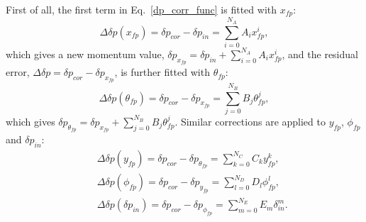  First of all, the first term in Eq.~\eqref{dp_corr_func} is fitted with $x_{fp}$:
\begin{equation}
 \Delta\delta p(x_{fp}) = \delta p_{cor} - \delta p_{in} = \sum_{i=0}^{N_{A}}A_{i}x_{fp}^{i},
 \label{deltap_corr_xfp}
\end{equation}
which gives a new momentum value, $\delta p_{x_{fp}}=\delta p_{in}+\sum_{i=0}^{N_{A}}A_{i}x_{fp}^{i}$, and the residual error, $\Delta\delta p = \delta p_{cor}-\delta p_{x_{fp}}$, is further fitted with $\theta_{fp}$:
\begin{equation}
 \Delta\delta p(\theta_{fp}) = \delta p_{cor} - \delta p_{x_{fp}} = \sum_{j=0}^{N_{B}}B_{j}\theta_{fp}^{j},
 \label{deltap_corr_thetafp}
\end{equation}
which gives $\delta p_{\theta_{fp}}=\delta p_{x_{fp}}+\sum_{j=0}^{N_{B}}B_{j}\theta_{fp}^{j}$. Similar corrections are applied to $y_{fp}$, $\phi_{fp}$ and $\delta p_{in}$:
\begin{eqnarray}
 &&\Delta\delta p(y_{fp}) = \delta p_{cor} - \delta p_{\theta_{fp}} = \sum_{k=0}^{N_{C}}C_{k}y_{fp}^{k},\\
 &&\Delta\delta p(\phi_{fp})   = \delta p_{cor} - \delta p_{y_{fp}} = \sum_{l=0}^{N_{D}}D_{l}\phi_{fp}^{l},\\
 &&\Delta\delta p(\delta p_{in})   = \delta p_{cor} - \delta p_{\phi_{fp}} = \sum_{m=0}^{N_{E}}E_{m}\delta_{in}^{m}.
 \label{deltap_corr_deltap}
\end{eqnarray}
